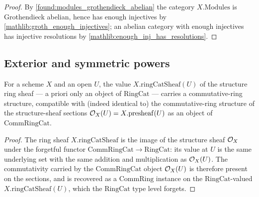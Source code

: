 \begin{proof}
  \leanok
  By \cref{found:modules_grothendieck_abelian} the category \(X.\mathrm{Modules}\)
  is Grothendieck abelian, hence has enough injectives by
  \cref{mathlib:groth_enough_injectives}; an abelian category with enough
  injectives has injective resolutions by
  \cref{mathlib:enough_inj_has_resolutions}.
\end{proof}

\subsection{Exterior and symmetric powers}

\begin{lemma}
  \label{found:ringcatsheaf_commring}
  For a scheme \(X\) and an open \(U\), the value \(X.\mathrm{ringCatSheaf}(U)\) of
  the structure ring sheaf --- a priori only an object of \(\mathrm{RingCat}\) ---
  carries a commutative-ring structure, compatible with (indeed identical to) the
  commutative-ring structure of the structure-sheaf sections \(\mathcal{O}_X(U)=
  X.\mathrm{presheaf}(U)\) as an object of \(\mathrm{CommRingCat}\).
\end{lemma}

\begin{proof}
  \leanok
  The ring sheaf \(X.\mathrm{ringCatSheaf}\) is the image of the structure sheaf
  \(\mathcal{O}_X\) under the forgetful functor \(\mathrm{CommRingCat}\to\mathrm{RingCat}\):
  its value at \(U\) is the same underlying set with the same addition and
  multiplication as \(\mathcal{O}_X(U)\).  The commutativity carried by the
  \(\mathrm{CommRingCat}\) object \(\mathcal{O}_X(U)\) is therefore present on the
  sections, and is recovered as a \(\mathrm{CommRing}\) instance on the
  \(\mathrm{RingCat}\)-valued \(X.\mathrm{ringCatSheaf}(U)\), which the
  \(\mathrm{RingCat}\) type level forgets.
\end{proof}

